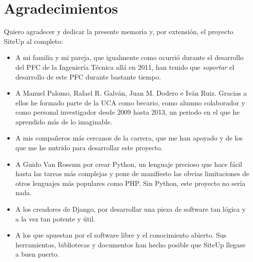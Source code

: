 \section*{Agradecimientos}
Quiero agradecer y dedicar la presente memoria y, por extensión, el proyecto
SiteUp al completo:

\begin{itemize}
\item A mi familia y mi pareja, que igualmente como ocurrió durante el
  desarrollo del PFC de la Ingeniería Técnica allá en 2011, han tenido que
  \textit{soportar} el desarrollo de este PFC durante bastante tiempo.

\item A Manuel Palomo, Rafael R. Galván, Juan M. Dodero e Iván Ruiz. Gracias a
  ellos he formado parte de la UCA como becario, como alumno colaborador y como
  personal investigador desde 2009 hasta 2013, un periodo en el que he aprendido
  más de lo imaginable.
 
\item A mis compañeros más cercanos de la carrera, que me han apoyado y de los
  que me he nutrido para desarrollar este proyecto.

\item A Guido Van Rossum por crear Python, un lenguaje precioso que hace fácil
  hasta las tareas más complejas y pone de manifiesto las obvias limitaciones de
  otros lenguajes más populares como PHP. Sin Python, este proyecto no sería nada.
\item A los creadores de Django, por desarrollar una pieza de software tan
  lógica y a la vez tan potente y útil. 

\item A los que apuestan por el software libre y el conocimiento abierto. Sus
  herramientas, bibliotecas y documentos han hecho posible que SiteUp llegase a
  buen puerto.
\end{itemize}

